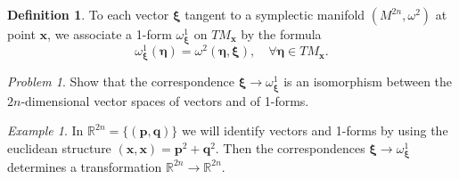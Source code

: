 \documentclass{book}
\numberwithin{equation}{section}
\theoremstyle{plain}
\theoremstyle{definition}
\newtheorem*{defn*}{Definition}
\theoremstyle{remark}
\theoremstyle{remark}
\newtheorem*{ex*}{Example}
\newtheorem*{prob*}{Problem}
\begin{document}
\begin{defn*}
%
To each vector $\pmb \xi$
tangent to a symplectic manifold $(M^{2n}, \omega^2)$
at point $\mathbf x$, we associate a 1-form $\omega^1_{\pmb \xi}$
on $TM_{\mathbf x}$ by the formula
$$
\omega^1_{\pmb \xi}(\pmb \eta) = \omega^2(\pmb \eta, \pmb \xi),
\quad \forall \pmb \eta \in TM_{\mathbf x}.
$$
\end{defn*}

\begin{prob*}
Show that the correspondence $\pmb \xi \rightarrow \omega^1_{\mathbf \xi}$
is an isomorphism between the $2n$-dimensional vector spaces of vectors
and of 1-forms.
\end{prob*}

\begin{ex*}
  In $\mathbb{R}^{2n}=\{(\mathbf p, \mathbf q)\}$
  we will identify vectors and 1-forms by using the euclidean structure
  $(\mathbf x, \mathbf x) = \mathbf p^2 + \mathbf q^2$.
  Then the correspondences $\pmb\xi \rightarrow \omega^1_{\pmb\xi}$
  determines a transformation
  $\mathbb{R}^{2n} \rightarrow \mathbb{R}^{2n}$.
\end{ex*}
\end{document}
